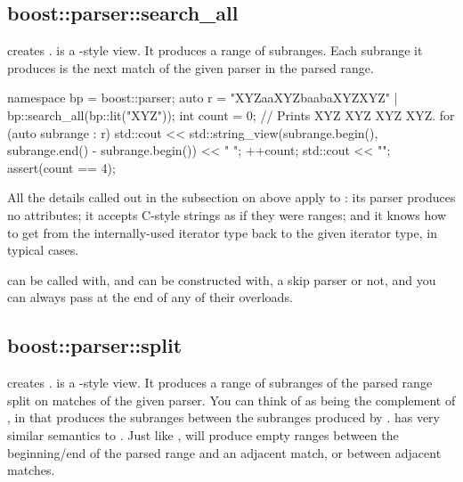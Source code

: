 \documentclass{MyBook}
\begin{document}
\subsection{boost::parser::search\_all}

 creates .  is a -style view. It produces a range of subranges. Each subrange it produces is the next match of the given parser in the parsed range.

\begin{code}
namespace bp = boost::parser;
auto r = "XYZaaXYZbaabaXYZXYZ" | bp::search_all(bp::lit("XYZ"));
int count = 0;
// Prints XYZ XYZ XYZ XYZ.
for (auto subrange : r) {
    std::cout << std::string_view(subrange.begin(), subrange.end() - subrange.begin()) << " ";
    ++count;
}
std::cout << "\n";
assert(count == 4);
\end{code}

All the details called out in the subsection on  above apply to : its parser produces no attributes; it accepts C-style strings as if they were ranges; and it knows how to get from the internally-used iterator type back to the given iterator type, in typical cases.

 can be called with, and  can be constructed with, a skip parser or not, and you can always pass  at the end of any of their overloads.

\subsection{boost::parser::split}

 creates .  is a -style view. It produces a range of subranges of the parsed range split on matches of the given parser. You can think of  as being the complement of , in that  produces the subranges between the subranges produced by .  has very similar semantics to . Just like ,  will produce empty ranges between the beginning/end of the parsed range and an adjacent match, or between adjacent matches.
\end{document}
